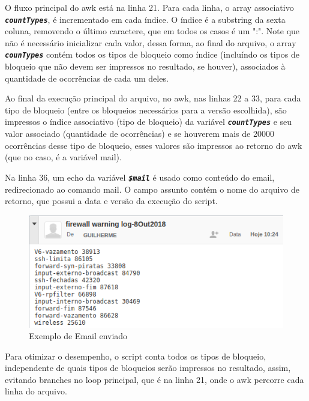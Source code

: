 \documentclass[oneside, 11 pt]{article}
\begin{document}
	O fluxo principal do awk está na linha 21. Para cada linha, o array associativo \texttt{\textbf{\textit{countTypes}}}, é incrementado em cada índice. O índice é a substring da sexta coluna, removendo o último caractere, que em todos os casos é um ":". Note que não é necessário inicializar cada valor, dessa forma, ao final do arquivo, o array \texttt{\textbf{\textit{counTypes}}} contém todos os tipos de bloqueio como índice (incluíndo os tipos de bloqueio que não devem ser impressos no resultado, se houver), associados à quantidade de ocorrências de cada um deles.
	
	Ao final da execução principal do arquivo, no awk, nas linhas 22 a 33, para cada tipo de bloqueio (entre os bloqueios necessários para a versão escolhida), são impressos o índice associativo (tipo de bloqueio) da variável \texttt{\textbf{\textit{countTypes}}} e seu valor associado (quantidade de ocorrências) e se houverem mais de 20000 ocorrências desse tipo de bloqueio, esses valores são impressos ao retorno do awk (que no caso, é a variável mail).
	
	Na linha 36, um echo da variável \texttt{\textbf{\textit{\$mail}}} é usado como conteúdo do email, redirecionado ao comando mail. O campo assunto contém o nome do arquivo de retorno, que possui a data e versão da execução do script.
	
	\begin{figure}[h]
		\includegraphics[width=\linewidth]{mail.png}
		\caption{Exemplo de Email enviado}
		\label{fig:mail}
	\end{figure}
	
	Para otimizar o desempenho, o script conta todos os tipos de bloqueio, independente de quais tipos de bloqueios serão impressos no resultado, assim, evitando branches no loop principal, que é na linha 21, onde o awk percorre cada linha do arquivo.
	
\end{document}
